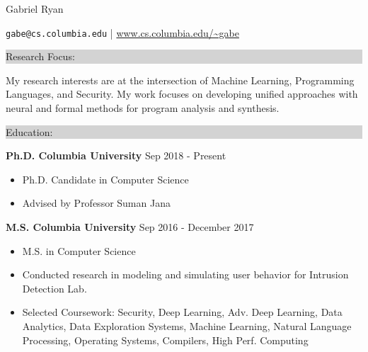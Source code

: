\documentclass{article} %
\newcommand{\rsection}[1]{
  \hspace{-0.4cm}\vspace{0.1cm}
\colorbox{lightgrey}{
\begin{minipage}{1.07\linewidth}
\vspace{0.22cm}
\fontsize{14pt}{16pt}\selectfont #1
\vspace{0.12cm}
\end{minipage}
}
\vspace*{-0.1cm}
}
\newcommand{\rjob}[2]{
  \hspace*{-0.3cm}
{\fontsize{10pt}{12pt}\selectfont #1} \hfill #2
\vspace*{0.1cm}
\hspace*{-1.2cm}
}
\newenvironment{ritemize}{
\hspace*{-0.8cm}
\begin{minipage}{1.05\linewidth}
\begin{itemize}
}{
\end{itemize}
\end{minipage}
}
\newcommand{\ritem}{
\item[-]
}
\begin{document}
\hspace*{-0.45cm}
{\fontsize{22pt}{22pt}\selectfont Gabriel Ryan}\\
\begin{minipage}{\linewidth}
\vspace{0.1cm}
  {\fontsize{12}{12}\selectfont
    \texttt{gabe@cs.columbia.edu} | \url{www.cs.columbia.edu/~gabe}
  }
\end{minipage}
\vspace{-0.15cm}

\rsection{Research Focus:}

My research interests are at the intersection of Machine Learning, Programming Languages, and Security. My work focuses on developing unified approaches with neural and formal methods for program analysis and synthesis.


\rsection{Education:}

\rjob{\textbf{Ph.D. Columbia University}}{Sep 2018 - Present}\\
\begin{ritemize}
\ritem Ph.D. Candidate in Computer Science
\ritem Advised by Professor Suman Jana
\end{ritemize}

\rjob{\textbf{M.S. Columbia University}}{Sep 2016 - December 2017}\\
\begin{ritemize}
  \ritem M.S. in Computer Science %
  \ritem Conducted research in modeling and simulating user behavior for Intrusion Detection Lab.
  \ritem Selected Coursework: Security, Deep Learning, Adv. Deep Learning, Data Analytics, Data Exploration Systems, Machine Learning, Natural Language Processing, Operating Systems, Compilers, High Perf. Computing
\end{ritemize}
\end{document}
